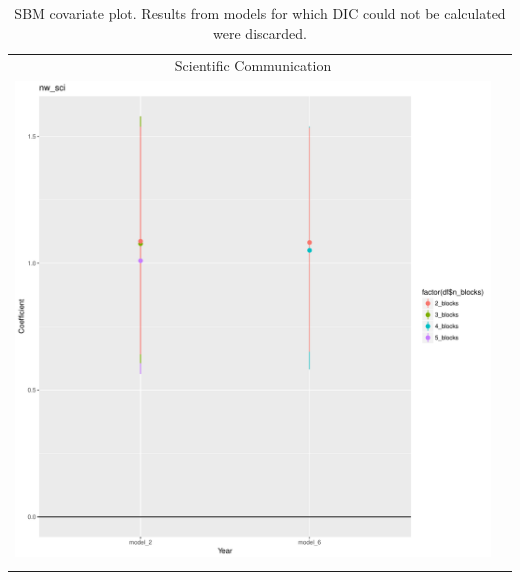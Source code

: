 \documentclass[fleqn,12pt]{wlscirep}
\begin{document}
\clearpage
\begin{longtable}[!h]{c@{\hskip 0cm}c}
Scientific Communication \\
\includegraphics[height=.75\textheight, clip=true, trim=.5cm .5cm 0cm .6cm]{figures/rl_plots2/nw_sci.pdf}   \\
\caption{\label{fig:SBM_plot_nwsci} SBM covariate plot. Results from models for which DIC could not be calculated were discarded.}
\end{longtable}
\end{document}
